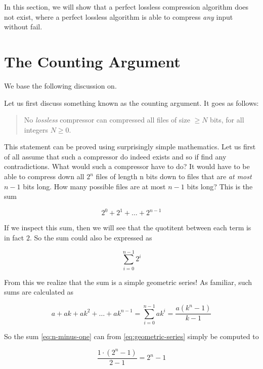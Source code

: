 In this section, we will show that a perfect lossless compression
algorithm does not exist, where a perfect lossless algorithm is able
to compress \textit{any} input without fail.

\section{The Counting Argument}

We base the following discussion on\cite{Salomon:2004:DCC,jean-loup-comp-faq}.

Let us first discuss something known as the counting argument. It goes
as follows:

\begin{quote}
  No \textit{lossless} compressor can compressed all files of size
  $\ge N$ bits, for all integers $N \ge 0$.
\end{quote}

This statement can be proved using surprisingly simple
mathematics. Let us first of all assume that such a compressor do
indeed exists and so if find any contradictions. What would such a
compressor have to do? It would have to be able to compress down all
$2^n$ files of length n bits down to files that are \textit{at most}
$n-1$ bits long. How many possible files are at most $n-1$ bits long?
This is the sum

\begin{equation}
  \label{eq:n-minus-one}
  2^0 + 2^1 + \dots + 2^{n-1}
\end{equation}

If we inspect this sum, then we will see that the quotitent between
each term is in fact $2$. So the sum could also be expressed as

\begin{equation*}
  \sum^{n-1}_{i = 0} 2^{i}
\end{equation*}

From this we realize that the sum is a simple geometric series! As
familiar, such sums are calculated as

\begin{equation}
  \label{eq:geometric-series}
  a + ak + ak^2 + \dots + ak^{n-1} = \sum^{n-1}_{i = 0} ak^{i} =
  \frac{a(k^n - 1)}{k -1}
\end{equation}

So the sum \eqref{eq:n-minus-one} can from \eqref{eq:geometric-series}
simply be computed to

\begin{equation*}
  \frac{1 \cdot (2^{n} - 1)}{2 -1} = 2^{n} - 1
\end{equation*}

